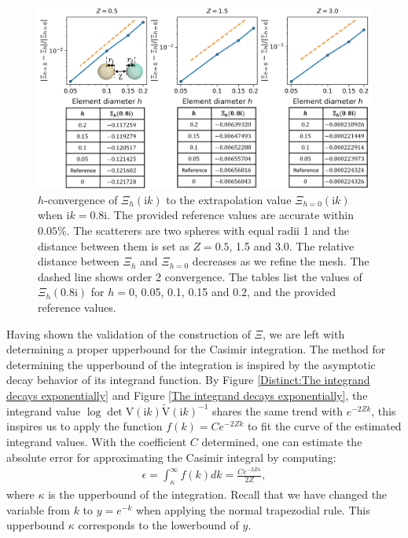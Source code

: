 \begin{figure}[H]
    \centering
    \includegraphics[width = \textwidth]{figures/Scalar_Xi_h_conv.png}
    \caption{$h$-convergence of $\Xi_{h}(\mathrm{i}k)$ to the extrapolation value $\Xi_{h = 0}(\mathrm{i}k)$ when $\mathrm{i}k = 0.8\mathrm{i}$. The provided reference values are accurate within $0.05\%$. The scatterers are two spheres with equal radii 1 and the distance between them is set as $Z = 0.5$, 1.5 and 3.0.
    The relative distance between $\Xi_{h}$ and $\Xi_{h = 0}$ decreases as we refine the mesh. The dashed line shows order 2 convergence. The tables list the values of $\Xi_{h}(0.8\mathrm{i})$ for $h = 0$, 0.05, 0.1, 0.15 and $0.2$, and the provided reference values.}
    \label{Scalar_Xi_h_conv}
\end{figure}

 Having shown the validation of the construction of $\Xi$, we are left with determining a proper upperbound for the Casimir integration. 
 The method for determining the upperbound of the integration is inspired by the asymptotic decay behavior of its integrand function.  
 By Figure \ref{Distinct:The integrand decays exponentially} and Figure \ref{The integrand decays exponentially}, the integrand value $\log\det\mathrm{V}(\mathrm{i}k)\tilde{\mathrm{V}}(\mathrm{i}k)^{-1}$ shares the same trend with $e^{-2Zk}$, this inspires us to apply the function $f(k) = Ce^{-2Zk}$ to fit the curve of the estimated integrand
 values. With the coefficient $C$ determined, one can estimate the absolute error for approximating the Casimir integral by computing:  
 \begin{align} \label{determine ub}
     \epsilon = \int_{\kappa}^{\infty}f(k)dk = \frac{Ce^{-2Z\kappa}}{2Z},
 \end{align}
 where $\kappa$ is the upperbound of the integration. Recall that we have changed the variable from $k$ to $y = e^{-k}$ when applying the normal trapezodial rule. This upperbound $\kappa$ corresponds to the lowerbound of $y$.
 
